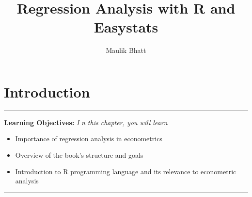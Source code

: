 \documentclass[english,10pt,final]{scrbook}
\title{Regression Analysis with R and Easystats}
\author{Maulik Bhatt}
\providecommand{\abstractname}{Learning Objectives} %
\newenvironment{secabstract}[1]{%
	\hrule
	\vspace{5pt}
	\small\textbf{\abstractname: } 
	\newline
	\vspace{0.1cm}
	\small\emph{#1} %
	\itshape %
}{%
	\hrule
	\vspace{0.6cm}
}
\begin{document}
\chapter{Introduction}
\begin{secabstract}
	In this chapter, you will learn
	\begin{itemize}
		\item {Importance of regression analysis in econometrics}
		\item{Overview of the book's structure and goals}
		\item{Introduction to R programming language and its relevance to econometric analysis}
	\end{itemize}

\end{secabstract}
\end{document}
